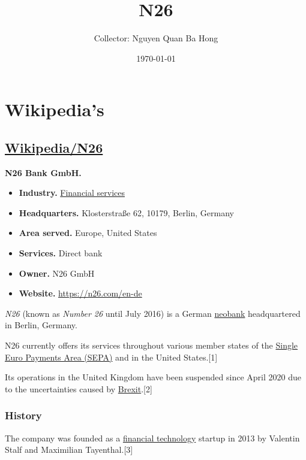\documentclass[onsided]{book}
\title{N26}
\author{Collector: Nguyen Quan Ba Hong}
\date{\today}
\numberwithin{equation}{section}
\begin{document}
\maketitle
\setcounter{secnumdepth}{6}
\setcounter{tocdepth}{6}
\tableofcontents


\part{Wikipedia's}

\chapter{\href{https://en.wikipedia.org/wiki/N26}{Wikipedia/N26}}

\textbf{N26 Bank GmbH.}
\begin{itemize}
    \item \textbf{Industry.} \href{https://en.wikipedia.org/wiki/Financial_services}{Financial services}
    \item \textbf{Headquarters.} Klosterstraße 62, 10179, Berlin, Germany
    \item \textbf{Area served.} Europe, United States
    \item \textbf{Services.} Direct bank
    \item \textbf{Owner.} N26 GmbH
    \item \textbf{Website.} \url{https://n26.com/en-de}
\end{itemize}
\textit{N26} (known as \textit{Number 26} until July 2016) is a German \href{https://en.wikipedia.org/wiki/Neobank}{neobank} headquartered in Berlin, Germany.

N26 currently offers its services throughout various member states of the \href{https://en.wikipedia.org/wiki/Single_Euro_Payments_Area}{Single Euro Payments Area (SEPA)} and in the United States.[1]

Its operations in the United Kingdom have been suspended since April 2020 due to the uncertainties caused by \href{https://en.wikipedia.org/wiki/Brexit}{Brexit}.[2]

\section{History}
The company was founded as a \href{https://en.wikipedia.org/wiki/Financial_technology}{financial technology} startup in 2013 by Valentin Stalf and Maximilian Tayenthal.[3]
\end{document}
